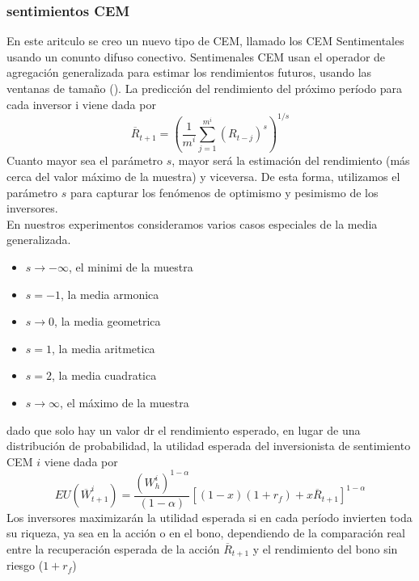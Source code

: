 \documentclass[12pt,a4paper]{article}
\begin{document}
\subsubsection*{sentimientos CEM}
En este aritculo se creo un nuevo tipo de CEM, llamado los CEM Sentimentales usando un conunto difuso conectivo. Sentimenales CEM usan el operador de agregación generalizada para estimar los rendimientos futuros, usando las ventanas de tamaño (). La predicción del rendimiento del próximo período para cada inversor i viene dada por
\begin{equation}
\overline{R}_{t+1}=\left(\frac{1}{m^i}\sum^{m^{i}}_{j=1}(R_{t-j})^s\right)^{1/s} \label{6.8}
\end{equation}
Cuanto mayor sea el parámetro $s$, mayor será la estimación del rendimiento (más cerca del valor máximo de la muestra) y viceversa. De esta forma, utilizamos el parámetro $s$ para capturar los fenómenos de optimismo y pesimismo de los inversores.\\
\quad En nuestros experimentos consideramos varios casos especiales de la media generalizada.
\begin{itemize}
\item $s \rightarrow -\infty$, el minimi de la muestra
\item $s = -1$, la media armonica  
\item $s \rightarrow 0$, la media geometrica
\item $s = 1$, la media aritmetica
\item $s = 2$, la media cuadratica
\item $s \rightarrow \infty$, el máximo de la muestra 
\end{itemize}
dado que solo hay un valor dr el rendimiento esperado, en lugar de una distribución de probabilidad, la utilidad esperada del inversionista de sentimiento CEM $i$ viene dada por
\begin{equation}
EU(\overline{W}^{i}_{t+1})=\frac{(W^{i}_h)^{1-\alpha}}{(1-\alpha)}\left[(1-x)(1+r_f)+x\overline{R}_{t+1}\right]^{1-\alpha} \label{6.9}
\end{equation}
Los inversores maximizarán la utilidad esperada si en cada período invierten toda su riqueza, ya sea en la acción o en el bono, dependiendo de la comparación real entre la recuperación esperada de la acción $\overline{R}_{t+1}$ y el rendimiento del bono sin riesgo ($1+r_f$)
\end{document}
